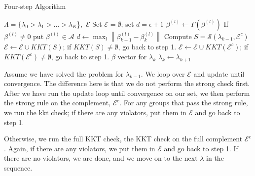 \documentclass[titlepage]{article}
\newcommand{\norm}[1]{\left\lVert #1 \right\rVert}
\begin{document}
\begin{algorithm}
  \caption{Four-step Algorithm\label{alg:fourStep}}
  \begin{algorithmic}
     $\Lambda = \{\lambda_0>\lambda_1> \dots > \lambda_K$\},\ $\mathcal{E}$
    \STATE Set $\mathcal{E}=\emptyset$; set $d=\epsilon+1$ 
    \STATE  $\beta^{(l)} \leftarrow \Gamma (\beta^{(l)})$
    \STATE If $\beta^{(l)} \neq 0$ put $\beta^{(l)} \in \mathcal{A}$	
	\ENDFOR
	\STATE $d \leftarrow \max_{l} \norm{\beta^{(l)}_{k-1}-\beta^{(l)}_{k}}$ 
	\ENDWHILE    
     Compute $S = \mathcal{S}(\lambda_{k-1}, \mathcal{E}^c)$
     $\mathcal{E} \leftarrow  \mathcal{E}\cup KKT(S)$; if $KKT(S) \neq \emptyset$, go back to step 1.  
	 $\mathcal{E} \leftarrow  \mathcal{E}\cup KKT(\mathcal{E}^c)$; if $KKT(\mathcal{E}^c) \neq \emptyset$, go back to step 1.
    \RETURN $\beta$ vector for $\lambda_k$
    \STATE $\lambda_k \leftarrow \lambda_{k+1}$
  \end{algorithmic}
\end{algorithm}



Assume we have solved the problem for $\lambda_{k-1}$. We loop over $\mathcal{E}$ and update until convergence. The difference here is that we do not perform the strong check first. After we have run the update loop until convergence on our set, we then perform the strong rule on the complement, $\mathcal{E}^c$. For any groups that pass the strong rule, we run the kkt check; if there are any violators, put them in $\mathcal{E}$ and go back to step 1. 

Otherwise, we run the full KKT check, the KKT check on the full complement $\mathcal{E}^c$. Again, if there are any violators, we put them in $\mathcal{E}$ and go back to step 1. If there are no violators, we are done, and we move on to the next $\lambda$ in the sequence.

\end{document}
